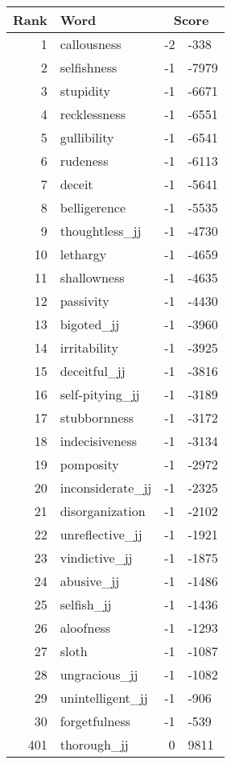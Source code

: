 \begin{longtable}[!htbp]{| rlr@{.}l |}
    \hline
    \textbf{Rank} & \textbf{Word} & \multicolumn{2}{c|}{\textbf{Score}} \\
    \hline
    \endhead
    1 & callousness & -2 & -338 \\
    2 & selfishness & -1 & -7979 \\
    3 & stupidity & -1 & -6671 \\
    4 & recklessness & -1 & -6551 \\
    5 & gullibility & -1 & -6541 \\
    6 & rudeness & -1 & -6113 \\
    7 & deceit & -1 & -5641 \\
    8 & belligerence & -1 & -5535 \\
    9 & thoughtless\_jj & -1 & -4730 \\
    10 & lethargy & -1 & -4659 \\
    11 & shallowness & -1 & -4635 \\
    12 & passivity & -1 & -4430 \\
    13 & bigoted\_jj & -1 & -3960 \\
    14 & irritability & -1 & -3925 \\
    15 & deceitful\_jj & -1 & -3816 \\
    16 & self-pitying\_jj & -1 & -3189 \\
    17 & stubbornness & -1 & -3172 \\
    18 & indecisiveness & -1 & -3134 \\
    19 & pomposity & -1 & -2972 \\
    20 & inconsiderate\_jj & -1 & -2325 \\
    21 & disorganization & -1 & -2102 \\
    22 & unreflective\_jj & -1 & -1921 \\
    23 & vindictive\_jj & -1 & -1875 \\
    24 & abusive\_jj & -1 & -1486 \\
    25 & selfish\_jj & -1 & -1436 \\
    26 & aloofness & -1 & -1293 \\
    27 & sloth & -1 & -1087 \\
    28 & ungracious\_jj & -1 & -1082 \\
    29 & unintelligent\_jj & -1 & -906 \\
    30 & forgetfulness & -1 & -539 \\
    401 & thorough\_jj & 0 & 9811 \\

\end{longtable}
